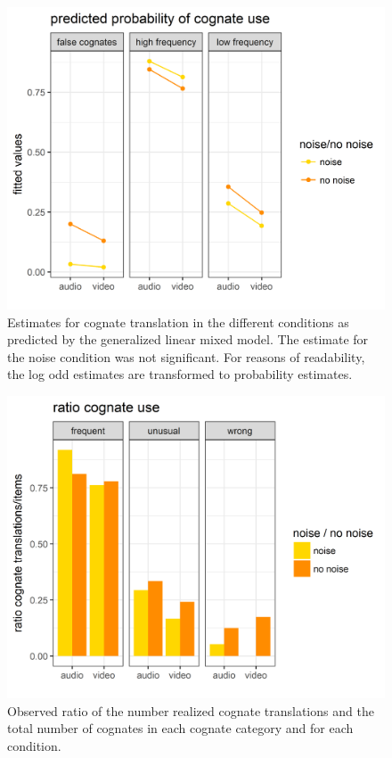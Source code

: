 \documentclass[output=paper]{LSP/langsci}
\begin{document}
\begin{figure}[p]
 \includegraphics[height=.4\textheight]{figures/gieshoff/figure1.png}
 \caption{Estimates for cognate translation in the different conditions as predicted by the generalized linear mixed model. The estimate for the noise condition was not significant. For reasons of readability, the log odd estimates are transformed to probability estimates.}
 \label{gieshoff:fig:1}
\end{figure}

\begin{figure}[p]
 \includegraphics[height=.4\textheight]{figures/gieshoff/figure2.png}
 \caption[Observed ratio of the number realized {cognate} translations and the total number of cognates in each {cognate} category and for each condition.]{Observed ratio of the number realized {cognate} translations and the total number of cognates in each {cognate} category and for each condition.\footnotemark }
 \label{gieshoff:fig:2}
\end{figure}
\end{document}
